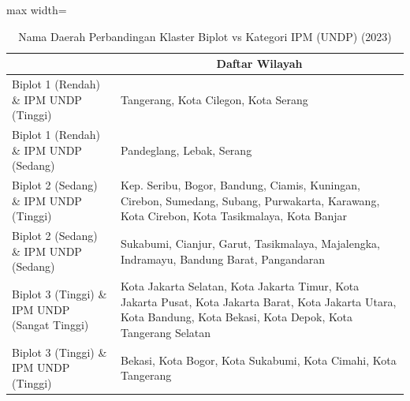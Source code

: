 \begin{table}[H]
\centering
\caption{Nama Daerah Perbandingan Klaster Biplot vs Kategori IPM (UNDP) (2023)} \label{tab:app1crossname2023}
\begin{adjustbox}{max width=\textwidth}
\begin{tabular}{|>{\centering\arraybackslash}p{4cm}|p{10cm}|}
\hline
\multicolumn{1}{|c|}{\textbf{Kategori}} & \multicolumn{1}{c|}{\textbf{Daftar Wilayah}} \\
\hline
Biplot 1 (Rendah) \& IPM UNDP (Tinggi) & Tangerang, Kota Cilegon, Kota Serang \\
\hline
Biplot 1 (Rendah) \& IPM UNDP (Sedang) & Pandeglang, Lebak, Serang \\
\hline
Biplot 2 (Sedang) \& IPM UNDP (Tinggi) & Kep. Seribu, Bogor, Bandung, Ciamis, Kuningan, Cirebon, Sumedang, Subang, Purwakarta, Karawang, Kota Cirebon, Kota Tasikmalaya, Kota Banjar \\
\hline
Biplot 2 (Sedang) \& IPM UNDP (Sedang) & Sukabumi, Cianjur, Garut, Tasikmalaya, Majalengka, Indramayu, Bandung Barat, Pangandaran \\
\hline
Biplot 3 (Tinggi) \& IPM UNDP (Sangat Tinggi) & Kota Jakarta Selatan, Kota Jakarta Timur, Kota Jakarta Pusat, Kota Jakarta Barat, Kota Jakarta Utara, Kota Bandung, Kota Bekasi, Kota Depok, Kota Tangerang Selatan \\
\hline
Biplot 3 (Tinggi) \& IPM UNDP (Tinggi) & Bekasi, Kota Bogor, Kota Sukabumi, Kota Cimahi, Kota Tangerang \\
\hline
\end{tabular}
\end{adjustbox}
\end{table}